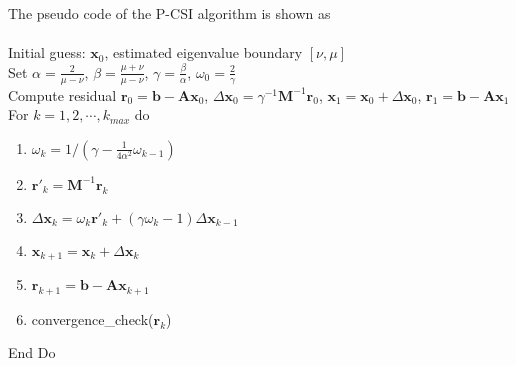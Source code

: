 The pseudo code of the P-CSI algorithm  is shown as \\
 \space \\
Initial guess: $\textbf{x}_0$, estimated eigenvalue boundary $[\nu,\mu]$\\
Set $\alpha =\frac{2}{\mu -\nu}$, $ \beta = \frac{\mu +\nu}{\mu -\nu}$, $\gamma = \frac{\beta}{\alpha}$, $\omega_0 =\frac{ 2}{\gamma}$ \\
Compute residual $\textbf{r}_0 = \textbf{b}- {\textbf{A}}\textbf{x}_0$, $\Delta \textbf{x}_{0} = \gamma^{-1}\textbf{M}^{-1}\textbf{r}_0$, $\textbf{x}_1 =\textbf{x}_0 +\Delta \textbf{x}_{0}$, $\textbf{r}_1 =\textbf{b} -\textbf{A}\textbf{x}_1$ \\
For $k = 1, 2, \cdots,  k_{max}$  do
\begin{enumerate}
\item $\omega_k  = 1/(\gamma - \frac{1}{4\alpha^2}\omega_{k-1})$
\item $\textbf{r}'_{k}=\textbf{M}^{-1}\textbf{r}_{k}$
\item $\Delta \textbf{x}_{k} =\omega_k\textbf{r}'_{k}+(\gamma \omega_k-1)\Delta \textbf{x}_{k-1}$
\item $\textbf{x}_{k+1} =\textbf{x}_{k}+\Delta \textbf{x}_{k}$
\item $\textbf{r}_{k+1} =\textbf{b}- \textbf{A}\textbf{x}_{k+1}$
\item convergence\_check($\textbf{r}_{k}$)
\end{enumerate}
End Do \\


